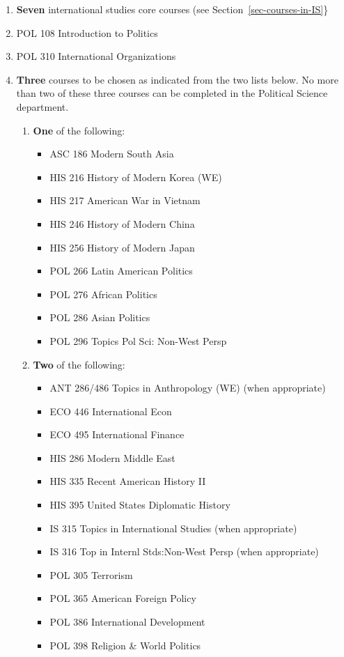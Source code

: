\documentclass[
  letterpaper,
]{scrbook}
\providecommand{\tightlist}{%
  \setlength{\itemsep}{0pt}\setlength{\parskip}{0pt}}
\begin{document}
\begin{enumerate}
\def\labelenumi{\arabic{enumi}.}
\item
  \textbf{Seven} international studies core courses (see
  Section~\ref{sec-courses-in-IS}\}
\item
  POL 108 Introduction to Politics
\item
  POL 310 International Organizations
\item
  \textbf{Three} courses to be chosen as indicated from the two lists
  below. No more than two of these three courses can be completed in the
  Political Science department.

  \begin{enumerate}
  \def\labelenumii{\alph{enumii}.}
  \tightlist
  \item
    \textbf{One} of the following:

    \begin{itemize}
    \tightlist
    \item
      ASC 186 Modern South Asia
    \item
      HIS 216 History of Modern Korea (WE)
    \item
      HIS 217 American War in Vietnam
    \item
      HIS 246 History of Modern China
    \item
      HIS 256 History of Modern Japan
    \item
      POL 266 Latin American Politics
    \item
      POL 276 African Politics
    \item
      POL 286 Asian Politics
    \item
      POL 296 Topics Pol Sci: Non-West Persp
    \end{itemize}
  \item
    \textbf{Two} of the following:

    \begin{itemize}
    \tightlist
    \item
      ANT 286/486 Topics in Anthropology (WE) (when appropriate)
    \item
      ECO 446 International Econ
    \item
      ECO 495 International Finance
    \item
      HIS 286 Modern Middle East
    \item
      HIS 335 Recent American History II
    \item
      HIS 395 United States Diplomatic History
    \item
      IS 315 Topics in International Studies (when appropriate)
    \item
      IS 316 Top in Internl Stds:Non-West Persp (when appropriate)
    \item
      POL 305 Terrorism
    \item
      POL 365 American Foreign Policy
    \item
      POL 386 International Development
    \item
      POL 398 Religion \& World Politics
    \end{itemize}
  \end{enumerate}
\end{enumerate}
\end{document}
